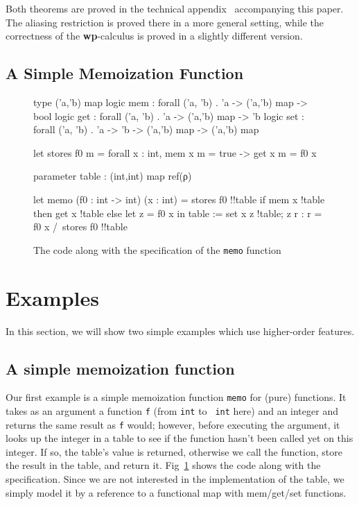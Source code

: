 \documentclass[a4paper]{llncs}
\newcommand{\wpre}{{\bf wp}}
\begin{document}
Both theorems are proved in the technical appendix~\cite{appendixesop2010}
accompanying this paper. The aliasing restriction is proved there in a more
general setting, while the correctness of the \wpre-calculus is proved in a
slightly different version.

\subsection{A Simple Memoization Function}

\begin{figure}[tpb]
\begin{who}
type ('a,'b) map
logic mem : forall ('a, 'b) . 'a -> ('a,'b) map -> bool
logic get : forall ('a, 'b) . 'a -> ('a,'b) map -> 'b
logic set : forall ('a, 'b) . 'a -> 'b -> ('a,'b) map -> ('a,'b) map

let stores f0 m =
  forall x : int, mem x m = true -> get x m = f0 x

parameter table : (int,int) map ref(ρ)

let memo (f0 : int -> int) (x : int) = 
  {stores f0 !!table}
  if mem x !table then get x !table
  else
    let z = f0 x in
    table := set x z !table;
    z
  {r : r = f0 x /\ stores f0 !!table}
\end{who}
  \caption{The code along with the specification of the {\tt memo} function}
  \label{fig:memo}
\end{figure}

\section{Examples}
\label{sec:examples}

In this section, we will show two simple examples which use higher-order
features.

\subsection{A simple memoization function}

Our first example is a simple memoization function {\tt memo} for (pure)
functions.  It takes as an argument a function {\tt f} (from {\tt int} to {\tt
int} here) and an integer and returns the same result as {\tt f} would;
however, before executing the argument, it looks up the integer in a table to
see if the function hasn't been called yet on this integer. If so, the table's
value is returned, otherwise we call the function, store the result in the
table, and return it. Fig~\ref{fig:memo} shows the code along with the
specification. Since we are not interested in the implementation of the table,
we simply model it by a reference to a functional map with mem/get/set functions.
\end{document}
